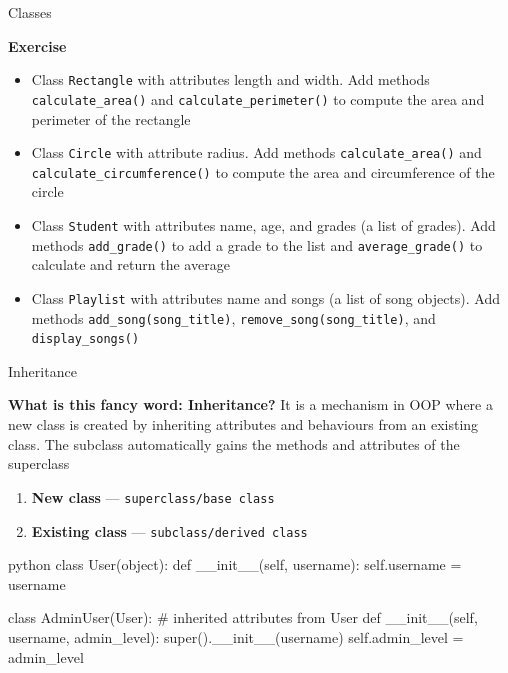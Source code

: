 \documentclass[
	11pt, 
]{beamer}
\begin{document}

\begin{frame}[fragile]{Classes}

\begin{alertblock}{\textbf{Exercise}}
\begin{itemize}
    \item Class \texttt{Rectangle} with attributes length and width. Add methods \texttt{calculate\_area()} and \texttt{calculate\_perimeter()} to compute the area and perimeter of the rectangle
    \vspace{.1cm}

    \item Class \texttt{Circle} with attribute radius. Add methods \texttt{calculate\_area()} and \texttt{calculate\_circumference()} to compute the area and circumference of the circle
    \vspace{.1cm}

    \item Class \texttt{Student} with attributes name, age, and grades (a list of grades). Add methods \texttt{add\_grade()} to add a grade to the list and \texttt{average\_grade()} to calculate and return the average
    \vspace{.1cm}

    \item Class \texttt{Playlist}  with attributes name and songs (a list of song objects). Add methods \texttt{add\_song(song\_title)}, \texttt{remove\_song(song\_title)}, and \texttt{display\_songs()}
\end{itemize}

\end{alertblock}

\end{frame}


\begin{frame}[fragile]{Inheritance}

\begin{block}{\textbf{What is this fancy word: Inheritance?}}
It is a mechanism in OOP where a new class is created by inheriting attributes and behaviours from an existing class. The subclass automatically gains the methods and attributes of the superclass
\end{block}
\begin{enumerate}
    \item \textbf{New class} --- \texttt{superclass/base class}
    \item \textbf{Existing class} --- \texttt{subclass/derived class}
\end{enumerate}

\begin{mintedbox}{python}
class User(object):
    def __init__(self, username):
        self.username = username
        
class AdminUser(User): # inherited attributes from User
    def __init__(self, username, admin_level):
        super().__init__(username)
        self.admin_level = admin_level
\end{mintedbox}
\end{frame}
\end{document}
